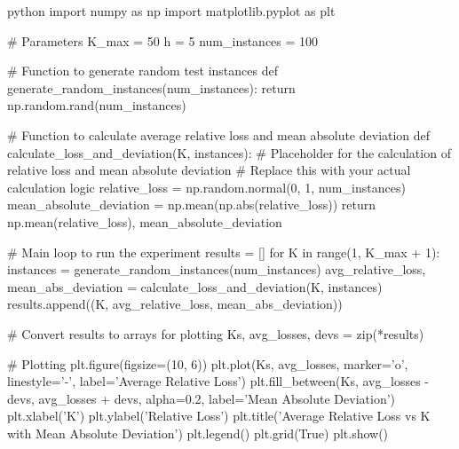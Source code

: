 python
import numpy as np
import matplotlib.pyplot as plt

# Parameters
K_max = 50
h = 5
num_instances = 100

# Function to generate random test instances
def generate_random_instances(num_instances):
    return np.random.rand(num_instances)

# Function to calculate average relative loss and mean absolute deviation
def calculate_loss_and_deviation(K, instances):
    # Placeholder for the calculation of relative loss and mean absolute deviation
    # Replace this with your actual calculation logic
    relative_loss = np.random.normal(0, 1, num_instances)
    mean_absolute_deviation = np.mean(np.abs(relative_loss))
    return np.mean(relative_loss), mean_absolute_deviation

# Main loop to run the experiment
results = []
for K in range(1, K_max + 1):
    instances = generate_random_instances(num_instances)
    avg_relative_loss, mean_abs_deviation = calculate_loss_and_deviation(K, instances)
    results.append((K, avg_relative_loss, mean_abs_deviation))

# Convert results to arrays for plotting
Ks, avg_losses, devs = zip(*results)

# Plotting
plt.figure(figsize=(10, 6))
plt.plot(Ks, avg_losses, marker='o', linestyle='-', label='Average Relative Loss')
plt.fill_between(Ks, avg_losses - devs, avg_losses + devs, alpha=0.2, label='Mean Absolute Deviation')
plt.xlabel('K')
plt.ylabel('Relative Loss')
plt.title('Average Relative Loss vs K with Mean Absolute Deviation')
plt.legend()
plt.grid(True)
plt.show()